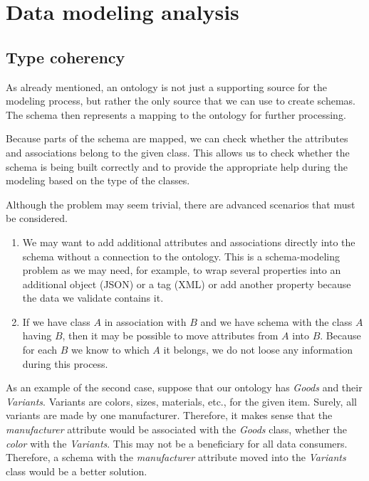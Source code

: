 \section{Data modeling analysis}

\subsection{Type coherency}\label{subsection:type-coherency}

As already mentioned, an ontology is not just a supporting source for the modeling process, but rather the only source that we can use to create schemas. The schema then represents a mapping to the ontology for further processing.

Because parts of the schema are mapped, we can check whether the attributes and associations belong to the given class. This allows us to check whether the schema is being built correctly and to provide the appropriate help during the modeling based on the type of the classes.

Although the problem may seem trivial, there are advanced scenarios that must be considered.

\begin{enumerate}
  \item We may want to add additional attributes and associations directly into the schema without a connection to the ontology. This is a schema-modeling problem as we may need, for example, to wrap several properties into an additional object (JSON) or a tag (XML) or add another property because the data we validate contains it.
  \item If we have class $A$ in association with $B$ and we have schema with the class $A$ having $B$, then it may be possible to move attributes from $A$ into $B$. Because for each $B$ we know to which $A$ it belongs, we do not loose any information during this process.
\end{enumerate}

As an example of the second case, suppose that our ontology has \textit{Goods} and their \textit{Variants}. Variants are colors, sizes, materials, etc., for the given item. Surely, all variants are made by one manufacturer. Therefore, it makes sense that the \textit{manufacturer} attribute would be associated with the \textit{Goods} class, whether the \textit{color} with the \textit{Variants}. This may not be a beneficiary for all data consumers. Therefore, a schema with the \textit{manufacturer} attribute moved into the \textit{Variants} class would be a better solution.

